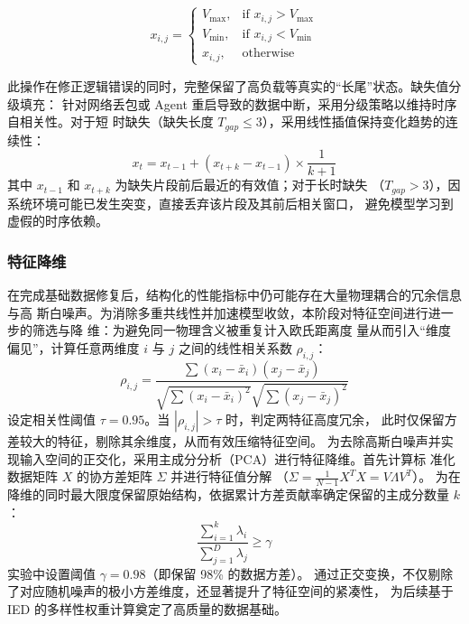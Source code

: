 \begin{equation}
x_{i,j} = \begin{cases} V_{\max}, & 
    \text{if } x_{i,j} > V_{\max} \\ V_{\min}, & 
    \text{if } x_{i,j} < V_{\min} \\ x_{i,j}, & 
    \text{otherwise} \end{cases}
\end{equation}

此操作在修正逻辑错误的同时，完整保留了高负载等真实的“长尾”状态。缺失值分级填充： 
针对网络丢包或 Agent 重启导致的数据中断，采用分级策略以维持时序自相关性。对于短
时缺失（缺失长度 $T_{gap} \le 3$），采用线性插值保持变化趋势的连续性：
\begin{equation}
x_t = x_{t-1} + (x_{t+k} - x_{t-1}) \times \frac{1}{k+1}
\end{equation}
其中 $x_{t-1}$ 和 $x_{t+k}$ 为缺失片段前后最近的有效值；对于长时缺失
（$T_{gap} > 3$），因系统环境可能已发生突变，直接丢弃该片段及其前后相关窗口，
避免模型学习到虚假的时序依赖。

\subsubsection{特征降维}
在完成基础数据修复后，结构化的性能指标中仍可能存在大量物理耦合的冗余信息与高
斯白噪声。为消除多重共线性并加速模型收敛，本阶段对特征空间进行进一步的筛选与降
维：为避免同一物理含义被重复计入欧氏距离度
量从而引入“维度偏见”，计算任意两维度 $i$ 与 $j$ 之间的线性相关系数 $\rho_{i,j}$：
\begin{equation}
\rho_{i,j} = \frac{\sum (x_i - \bar{x}_i)(x_j - \bar{x}_j)}
{\sqrt{\sum (x_i - \bar{x}_i)^2} \sqrt{\sum (x_j - \bar{x}_j)^2}}
\end{equation}
设定相关性阈值 $\tau = 0.95$。当 $|\rho_{i,j}| > \tau$ 时，判定两特征高度冗余，
此时仅保留方差较大的特征，剔除其余维度，从而有效压缩特征空间。 
为去除高斯白噪声并实现输入空间的正交化，采用主成分分析（PCA）进行特征降维。首先计算标
准化数据矩阵 $X$ 的协方差矩阵 $\Sigma$ 并进行特征值分解
（$\Sigma = \frac{1}{N-1} X^{T} X = V \Lambda V^{T}$）。
为在降维的同时最大限度保留原始结构，依据累计方差贡献率确定保留的主成分数量 
$k$：
\begin{equation}
\frac{\sum_{i=1}^{k} \lambda_i}{\sum_{j=1}^{D} \lambda_j} 
\ge \gamma
\end{equation}
实验中设置阈值 $\gamma = 0.98$（即保留 98\% 的数据方差）。
通过正交变换，不仅剔除了对应随机噪声的极小方差维度，还显著提升了特征空间的紧凑性，
为后续基于 IED 的多样性权重计算奠定了高质量的数据基础。

